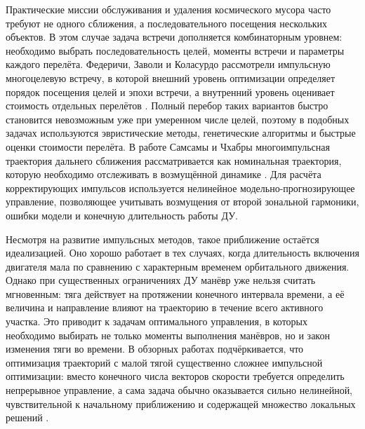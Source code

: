 Практические миссии обслуживания и удаления космического мусора часто требуют не одного сближения, а последовательного посещения нескольких объектов. В этом случае задача встречи дополняется комбинаторным уровнем: необходимо выбрать последовательность целей, моменты встречи и параметры каждого перелёта. Федеричи, Заволи и Коласурдо рассмотрели импульсную многоцелевую встречу, в которой внешний уровень оптимизации определяет порядок посещения целей и эпохи встречи, а внутренний уровень оценивает стоимость отдельных перелётов \cite{federici2019impulsive}. Полный перебор таких вариантов быстро становится невозможным уже при умеренном числе целей, поэтому в подобных задачах используются эвристические методы, генетические алгоритмы и быстрые оценки стоимости перелёта. В работе Самсамы и Чхабры многоимпульсная траектория дальнего сближения рассматривается как номинальная траектория, которую необходимо отслеживать в возмущённой динамике \cite{samsam2023nonlinear}. Для расчёта корректирующих импульсов используется нелинейное модельно-прогнозирующее управление, позволяющее учитывать возмущения от второй зональной гармоники, ошибки модели и конечную длительность работы ДУ.

Несмотря на развитие импульсных методов, такое приближение остаётся идеализацией. Оно хорошо работает в тех случаях, когда длительность включения двигателя мала по сравнению с характерным временем орбитального движения. Однако при существенных ограничениях ДУ манёвр уже нельзя считать мгновенным: тяга действует на протяжении конечного интервала времени, а её величина и направление влияют на траекторию в течение всего активного участка. Это приводит к задачам оптимального управления, в которых необходимо выбирать не только моменты выполнения манёвров, но и закон изменения тяги во времени. В обзорных работах подчёркивается, что оптимизация траекторий с малой тягой существенно сложнее импульсной оптимизации: вместо конечного числа векторов скорости требуется определить непрерывное управление, а сама задача обычно оказывается сильно нелинейной, чувствительной к начальному приближению и содержащей множество локальных решений \cite{betts1998survey, chai2019review, morante2021survey}.

